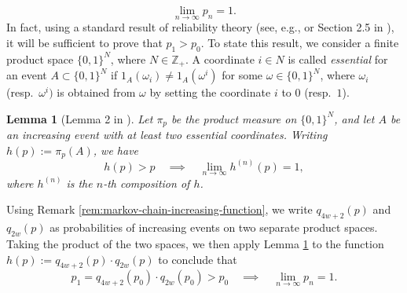 \documentclass[11pt]{article}
\newcommand{\Z}{\mathbb{Z}}
\newtheorem{lemma}{Lemma}
\theoremstyle{remark}
\begin{document}
\begin{equation}\label{eq:asymp-survival}
        \lim_{n \rightarrow \infty} p_{n} = 1.
\end{equation}
In fact, using a standard result of reliability theory (see, e.g., \cite{durrett1992stochastic} or Section 2.5 in \cite{grimmett1999percolation}), it will be sufficient to prove that 
$p_1 > p_0$.
To state this result, we consider a finite product space $\{0,1\}^N$, where $N \in \Z_+$. A coordinate $i \in N$ is called \emph{essential} for an event $A\subset \{0,1\}^N$ if $\mathrm{1}_A(\omega_i) \neq \mathrm{1}_A(\omega^i)$ for some $\omega \in \{0,1\}^N$, where $\omega_i$ (resp.\ $\omega^i)$ is obtained from $\omega$ by setting the coordinate $i$ to $0$ (resp.\ $1$).
\begin{lemma}[Lemma 2 in \cite{durrett1992stochastic}] \label{DurrettIncreasingLemma}
    Let $\pi_p$ be the product measure on $\{0,1\}^N$, and let $A$ be an increasing event with at least two essential coordinates. Writing $h(p):=\pi_p(A)$, we have 
    \begin{equation}
        h(p) > p \quad \implies \quad \lim_{n \rightarrow \infty} h^{(n)}(p) = 1,
    \end{equation}
    where $h^{(n)}$ is the $n$-th composition of $h$.
\end{lemma}
Using Remark \ref{rem:markov-chain-increasing-function}, we write $q_{4w+2}(p)$ and $q_{2w}(p)$ as probabilities of increasing events on two separate product spaces. Taking the product of the two spaces, we then apply Lemma \ref{DurrettIncreasingLemma} to the function $h(p) := q_{4w+2}(p) \cdot q_{2w}(p)$ to conclude that 
 \begin{equation}
        p_1 = q_{4w+2}(p_0) \cdot q_{2w}(p_0) > p_0 \quad \implies \quad \lim_{n \rightarrow \infty} p_n = 1.
    \end{equation}
\end{document}
